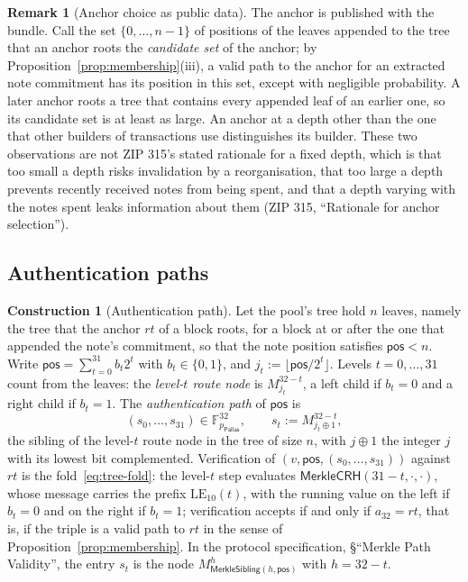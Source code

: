 \documentclass[11pt,a4paper]{article}
\theoremstyle{definition}
\newtheorem{construction}[theorem]{Construction}
\newtheorem{remark}[theorem]{Remark}
\newcommand{\F}{\mathbb{F}}
\newcommand{\Pallas}{\ensuremath{\mathsf{Pallas}}}
\begin{document}
\begin{remark}[Anchor choice as public data]
The anchor is published with the bundle. Call the set
$\{0, \dots, n - 1\}$ of positions of the leaves appended to the tree that
an anchor roots the \emph{candidate set} of the anchor; by
Proposition~\ref{prop:membership}(iii), a valid path to the anchor for an
extracted note commitment has its position in this set, except with
negligible probability. A later anchor roots a tree that contains every
appended leaf of an earlier one, so its candidate set is at least as large.
An anchor at a depth other than the one that other builders of transactions
use distinguishes its builder. These two observations are not ZIP 315's
stated rationale for a fixed depth, which is that too small a depth risks
invalidation by a reorganisation, that too large a depth prevents recently
received notes from being spent, and that a depth varying with the notes
spent leaks information about them (ZIP 315, ``Rationale for anchor
selection'').
\end{remark}

\FloatBarrier
\subsection{Authentication paths}\label{sec:tree-paths}

\begin{construction}[Authentication path]
Let the pool's tree hold $n$ leaves, namely the tree that the anchor
$\mathit{rt}$ of a block roots, for a block at or after the one that
appended the note's commitment, so that the note position satisfies
$\mathsf{pos} < n$. Write $\mathsf{pos} = \sum_{t=0}^{31} b_t 2^t$ with
$b_t \in \{0, 1\}$, and $j_t := \lfloor \mathsf{pos}/2^t \rfloor$. Levels
$t = 0, \dots, 31$ count from the leaves: the \emph{level-$t$ route node} is
$M^{32-t}_{j_t}$, a left child if $b_t = 0$ and a right child if $b_t = 1$.
The \emph{authentication path} of $\mathsf{pos}$ is
\[
  (s_0, \dots, s_{31}) \in \F_{p_{\Pallas}}^{32}, \qquad
  s_t := M^{32-t}_{j_t \oplus 1},
\]
the sibling of the level-$t$ route node in the tree of size $n$, with
$j \oplus 1$ the integer $j$ with its lowest bit complemented. Verification
of $(v, \mathsf{pos}, (s_0, \dots, s_{31}))$ against $\mathit{rt}$ is the
fold~\eqref{eq:tree-fold}: the level-$t$ step evaluates
$\mathsf{MerkleCRH}(31 - t, \cdot, \cdot)$, whose message carries the prefix
$\mathrm{LE}_{10}(t)$, with the running value on the left if $b_t = 0$ and
on the right if $b_t = 1$; verification accepts if and only if
$a_{32} = \mathit{rt}$, that is, if the triple is a valid path to
$\mathit{rt}$ in the sense of Proposition~\ref{prop:membership}. In the
protocol specification, \S``Merkle Path Validity'', the entry $s_t$ is the
node $M^h_{\mathsf{MerkleSibling}(h, \mathsf{pos})}$ with $h = 32 - t$.
\end{construction}
\end{document}
